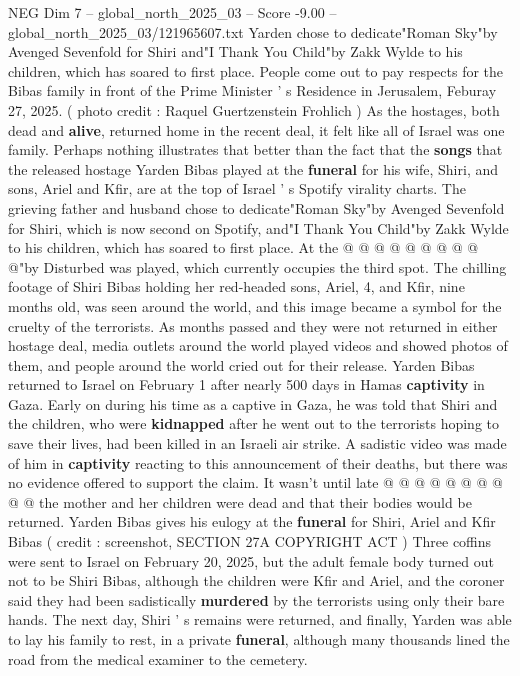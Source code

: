 \begin{textsample}{NEG Dim 7 – global\_north\_2025\_03 – Score -9.00 – global\_north\_2025\_03/121965607.txt}  \label{ex:f7_neg_123}
Yarden chose to dedicate"Roman Sky"by Avenged Sevenfold for Shiri and"I Thank You Child"by Zakk Wylde to his children, which has soared to first place.
People come out to pay respects for the Bibas family in front of the Prime Minister ' s Residence in Jerusalem, Feburay 27, 2025. ( photo credit : Raquel Guertzenstein Frohlich ) As the hostages, both dead and \textbf{alive}, returned home in the recent deal, it felt like all of Israel was one family.
Perhaps nothing illustrates that better than the fact that the \textbf{songs} that the released hostage Yarden Bibas played at the \textbf{funeral} for his wife, Shiri, and sons, Ariel and Kfir, are at the top of Israel ' s Spotify virality charts.
The grieving father and husband chose to dedicate"Roman Sky"by Avenged Sevenfold for Shiri, which is now second on Spotify, and"I Thank You Child"by Zakk Wylde to his children, which has soared to first place.
At the @ @ @ @ @ @ @ @ @ @"by Disturbed was played, which currently occupies the third spot.
The chilling footage of Shiri Bibas holding her red-headed sons, Ariel, 4, and Kfir, nine months old, was seen around the world, and this image became a symbol for the cruelty of the terrorists.
As months passed and they were not returned in either hostage deal, media outlets around the world played videos and showed photos of them, and people around the world cried out for their release.
Yarden Bibas returned to Israel on February 1 after nearly 500 days in Hamas \textbf{captivity} in Gaza.
Early on during his time as a captive in Gaza, he was told that Shiri and the children, who were \textbf{kidnapped} after he went out to the terrorists hoping to save their lives, had been killed in an Israeli air strike.
A sadistic video was made of him in \textbf{captivity} reacting to this announcement of their deaths, but there was no evidence offered to support the claim.
It wasn't until late @ @ @ @ @ @ @ @ @ @ the mother and her children were dead and that their bodies would be returned.
Yarden Bibas gives his eulogy at the \textbf{funeral} for Shiri, Ariel and Kfir Bibas ( credit : screenshot, SECTION 27A COPYRIGHT ACT ) Three coffins were sent to Israel on February 20, 2025, but the adult female body turned out not to be Shiri Bibas, although the children were Kfir and Ariel, and the coroner said they had been sadistically \textbf{murdered} by the terrorists using only their bare hands.
The next day, Shiri ' s remains were returned, and finally, Yarden was able to lay his family to rest, in a private \textbf{funeral}, although many thousands lined the road from the medical examiner to the cemetery.

\end{textsample}

